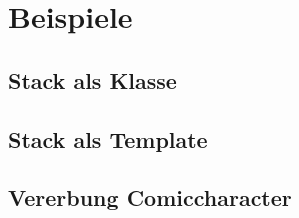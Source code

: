 \section{Beispiele}
	\subsection{Stack als Klasse}
		
	
\newpage	
	\subsection{Stack als Template}
		
		
\newpage
 	\subsection{Vererbung Comiccharacter}
 		
 		
 		
 		
 		